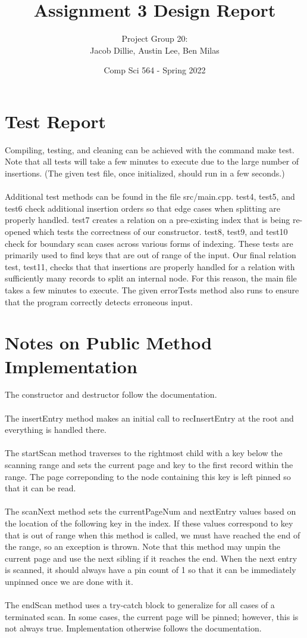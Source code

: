 \documentclass{article}
\title{Assignment 3 Design Report}
\author{Project Group 20:\\Jacob Dillie, Austin Lee, Ben Milas}
\date{Comp Sci 564 - Spring 2022}
\begin{document}
\maketitle
\section*{Test Report}
Compiling, testing, and cleaning can be achieved with the command \color{blue}make test\color{black}. Note that all tests will take a few minutes to execute due to the large number of insertions. (The given test file, once initialized, should run in a few seconds.)
\\\\
Additional test methods can be found in the file src/main.cpp. test4, test5, and test6 check additional insertion orders so that edge cases when splitting are properly handled. test7 creates a relation on a pre-existing index that is being re-opened which tests the correctness of our constructor. test8, test9, and test10 check for boundary scan cases across various forms of indexing. These tests are primarily used to find keys that are out of range of the input. Our final relation test, test11, checks that that insertions are properly handled for a relation with sufficiently many records to split an internal node. For this reason, the main file takes a few minutes to execute. The given errorTests method also runs to ensure that the program correctly detects erroneous input.
\\
\section*{Notes on Public Method Implementation}
The constructor and destructor follow the documentation.
\\\\
The insertEntry method makes an initial call to recInsertEntry at the root and everything is handled there.
\\\\
The startScan method traverses to the rightmost child with a key below the scanning range and sets the current page and key to the first record within the range. The page correponding to the node containing this key is left pinned so that it can be read.
\\\\
The scanNext method sets the currentPageNum and nextEntry values based on the location of the following key in the index. If these values correspond to key that is out of range when this method is called, we must have reached the end of the range, so an exception is thrown. Note that this method may unpin the current page and use the next sibling if it reaches the end. When the next entry is scanned, it should always have a pin count of 1 so that it can be immediately unpinned once we are done with it.
\\\\
The endScan method uses a try-catch block to generalize for all cases of a terminated scan. In some cases, the current page will be pinned; however, this is not always true. Implementation otherwise follows the documentation.
\\
\end{document}
